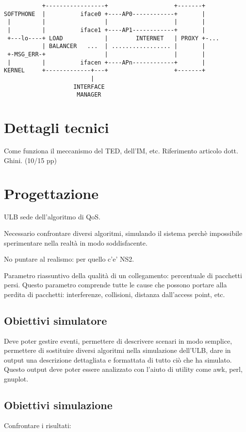 \documentclass[12pt,a4paper,openright,twoside]{book}
\begin{document}
\begin{verbatim}
           +-----------------+                   +-------+
SOFTPHONE  |          iface0 +----AP0------------+       |
 |         |                 |                   |       |
 |         |          iface1 +----AP1------------+       |
 +---lo----+ LOAD            |        INTERNET   | PROXY +-...
           | BALANCER   ...  | ................. |       |
 +-MSG_ERR-+                 |                   |       |
 |         |          ifacen +----APn------------+       |
KERNEL     +-------------+---+                   +-------+
                         |
                    INTERFACE
                     MANAGER
\end{verbatim}

\chapter{Dettagli tecnici}
Come funziona il meccanismo del TED, dell'IM, etc. Riferimento
articolo dott. Ghini. (10/15 pp)

\chapter{Progettazione}
ULB sede dell'algoritmo di QoS.

Necessario confrontare diversi algoritmi, simulando il sistema perchè
impossibile sperimentare nella realtà in modo soddisfacente.

No puntare al realismo: per quello c'e' NS2.

Parametro riassuntivo della qualità di un collegamento: percentuale di
pacchetti persi. Questo parametro comprende tutte le cause che possono
portare alla perdita di pacchetti: interferenze, collisioni, distanza
dall'access point, etc.

\section{Obiettivi simulatore}
Deve poter gestire eventi, permettere di descrivere scenari in modo
semplice, permettere di sostituire diversi algoritmi nella simulazione
dell'ULB, dare in output una descrizione dettagliata e formattata di
tutto ciò che ha simulato. Questo output deve poter essere analizzato
con l'aiuto di utility come awk, perl, gnuplot.

\section{Obiettivi simulazione}
Confrontare i risultati:
\end{document}
